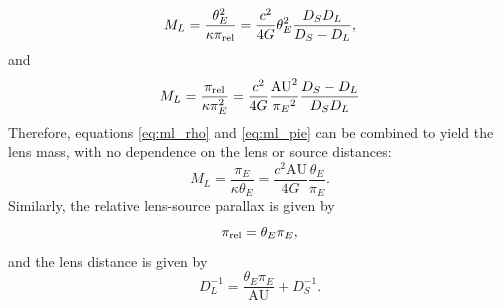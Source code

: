 \documentclass[twocolumn]{aastex631}
\begin{document}
\begin{equation}\label{eq:ml_rho}
    M_L = \frac{\theta_E^2}{\kappa \pi_{\rm rel}}= \frac{c^2}{4G}\theta_E^2\frac{D_S D_L}{D_S - D_L},
\end{equation}
and
\begin{equation}\label{eq:ml_pie}
    M_L = \frac{\pi_{\rm rel}}{\kappa \pi_E^2}=\frac{c^2}{4G}\frac{\textrm{AU}^2}{{\pi_E}^2}\frac{D_S - D_L}{D_S D_L}
\end{equation}
\noindent Therefore, equations \ref{eq:ml_rho} and \ref{eq:ml_pie} can be combined to yield the lens mass, with no dependence on the lens or source distances:
\begin{equation}\label{eq:ml}
    M_L = \frac{\pi_E}{\kappa \theta_E}=\frac{c^2\textrm{AU}}{4G}\frac{\theta_E}{\pi_E}.
\end{equation}
Similarly, the relative lens-source parallax is given by
\begin{equation}\label{eq:pirel}
    \pi_{\rm rel} = \theta_E\pi_E,
\end{equation} 
and the lens distance is given by
\begin{equation}\label{eq:dl-ls}
    D_L^{-1} = \frac{\theta_E\pi_E}{\textrm{AU}} + D_S^{-1}.
\end{equation}
\end{document}
